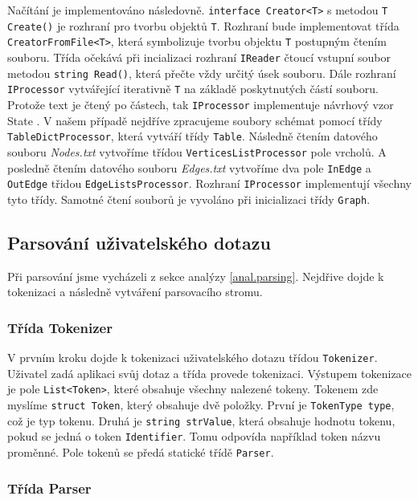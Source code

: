 Načítání je implementováno následovně.
\texttt{interface Creator<T>} s metodou \texttt{T Create()} je rozhraní pro tvorbu objektů \texttt{T}.
Rozhraní bude implementovat třída \texttt{CreatorFromFile<T>}, která symbolizuje tvorbu objektu \texttt{T} postupným čtením souboru.
Třída očekává při incializaci rozhraní \texttt{IReader} čtoucí vstupní soubor metodou \texttt{string Read()}, která přečte vždy určitý úsek souboru.
Dále rozhraní \texttt{IProcessor} vytvářející iterativně \texttt{T} na základě poskytnutých částí souboru.
Protože text je čtený po částech, tak \texttt{IProcessor} implementuje návrhový vzor State \citep[str. 305]{patterns}.
V našem případě nejdříve zpracujeme soubory schémat pomocí třídy \texttt{TableDictProcessor}, která vytváří třídy \texttt{Table}.
Následně čtením datového souboru \textit{Nodes.txt} vytvoříme třídou \texttt{VerticesListProcessor} pole vrcholů.
A posledně čtením datového souboru \textit{Edges.txt} vytvoříme dva pole \texttt{InEdge} a \texttt{OutEdge} třidou \texttt{EdgeListsProcessor}. 
Rozhraní \texttt{IProcessor} implementují všechny tyto třídy.
Samotné čtení souborů je vyvoláno při inicializaci třídy \texttt{Graph}.

\subsection{Parsování uživatelského dotazu} \label{impl.parsing}

Při parsování jsme vycházeli z sekce analýzy \ref{anal.parsing}.
Nejdřive dojde k tokenizaci a následně vytváření parsovacího stromu.

\subsubsection{Třída Tokenizer}

V prvním kroku dojde k tokenizaci uživatelského dotazu třídou \texttt{Tokenizer}.
Uživatel zadá aplikaci svůj dotaz a třída provede tokenizaci.
Výstupem tokenizace je pole \texttt{List<Token>}, které obsahuje všechny nalezené tokeny.
Tokenem zde myslíme \texttt{struct Token}, který obsahuje dvě položky.
První je \texttt{TokenType type}, což je typ tokenu.
Druhá je \texttt{string strValue}, která obsahuje hodnotu tokenu, pokud se jedná o token \texttt{Identifier}.
Tomu odpovída například token názvu proměnné.
Pole tokenů se předá statické třídě \texttt{Parser}.

\subsubsection{Třída Parser}

